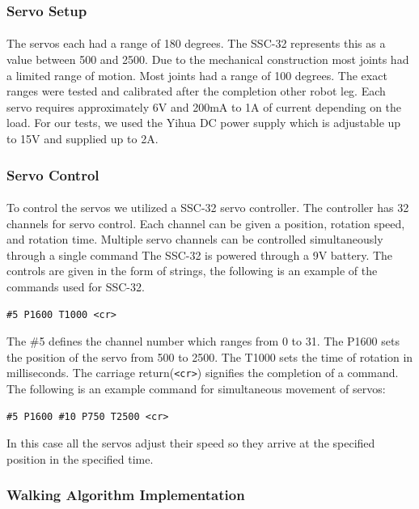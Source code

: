 \documentclass[titlepage,letterpaper,12pt]{article}
\begin{document}
\subsubsection{Servo Setup}
\paragraph{}The servos each had a range of 180 degrees. The SSC-32 represents
this as a value between 500 and 2500. Due to the mechanical construction most
joints had a limited range of motion. Most joints had a range of 100 degrees.
The exact ranges were tested and calibrated after the completion other robot
leg. Each servo requires approximately 6V and 200mA to 1A of current depending
on the load\cite{servodata}. For our tests, we used the Yihua DC power supply
which is adjustable up to 15V and supplied up to 2A\cite{yihuadata}.

\subsubsection{Servo Control}
\paragraph{}To control the servos we utilized a SSC-32 servo controller. The
controller has 32 channels for servo control. Each channel can be given a
position, rotation speed, and rotation time. Multiple servo channels can be
controlled simultaneously through a single command The SSC-32 is powered through
a 9V battery. The controls are given in the form of strings, the following is an
example of the commands used for SSC-32.
\begin{verbatim}
#5 P1600 T1000 <cr>
\end{verbatim}
The \#5 defines the channel number which ranges from 0 to 31. The P1600 sets the
position of the servo from 500 to 2500. The T1000 sets the time of rotation in
milliseconds. The carriage return(\verb!<cr>!) signifies the completion of a
command. The following is an example command for simultaneous movement of
servos:
\begin{verbatim}
#5 P1600 #10 P750 T2500 <cr>
\end{verbatim}
In this case all the servos adjust their speed so they arrive at the specified
position in the specified time.

\subsubsection{Walking Algorithm Implementation}
\end{document}
